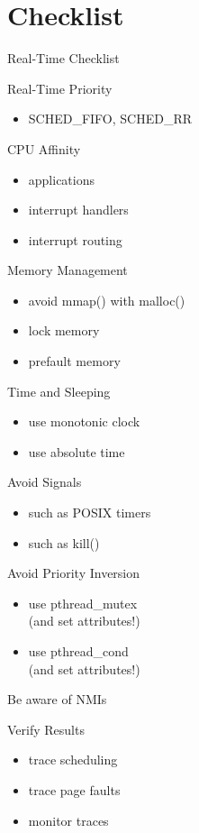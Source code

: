 \section{Checklist}

\begin{frame}
   {Real-Time Checklist}

   \small{
      \begin{multicols}{2}
         Real-Time Priority
         \begin{itemize}
            \item SCHED\_FIFO, SCHED\_RR
         \end{itemize}

         CPU Affinity
         \begin{itemize}
            \item applications
            \item interrupt handlers
            \item interrupt routing
         \end{itemize}

         Memory Management
         \begin{itemize}
            \item avoid mmap() with malloc()
            \item lock memory
            \item prefault memory
         \end{itemize}

         Time and Sleeping
         \begin{itemize}
            \item use monotonic clock
            \item use absolute time
         \end{itemize}

         Avoid Signals
         \begin{itemize}
            \item such as POSIX timers
            \item such as kill()
         \end{itemize}

         Avoid Priority Inversion
         \begin{itemize}
            \item use pthread\_mutex \\ (and set attributes!)
            \item use pthread\_cond \\ (and set attributes!)
         \end{itemize}

         Be aware of NMIs

         Verify Results
         \begin{itemize}
            \item trace scheduling
            \item trace page faults
            \item monitor traces
         \end{itemize}
      \end{multicols}
   }

\end{frame}

